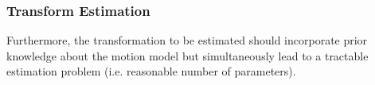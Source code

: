 \subsubsection{Transform Estimation}
Furthermore, the transformation to be estimated should incorporate prior knowledge about the motion model but simultaneously lead to a tractable estimation problem (i.e. reasonable number of parameters).
%
%
%


